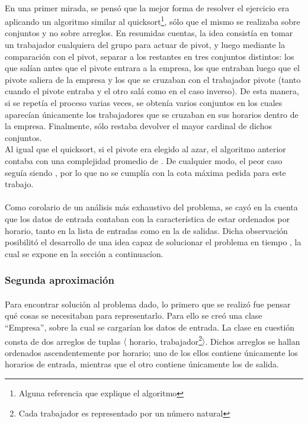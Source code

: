 \paragraph{}
En una primer mirada, se pens\'o que la mejor forma de resolver el ejercicio era aplicando un algoritmo similar al quicksort\footnote{Alguna referencia que explique el algoritmo}, s\'olo que el mismo se realizaba sobre conjuntos y no sobre arreglos. En resumidas cuentas, la idea consist\'ia en tomar un trabajador cualquiera del grupo para actuar de pivot, y luego mediante la comparaci\'on con el pivot, separar a los restantes en tres conjuntos distintos: los que sal\'ian antes que el pivote entrara a la empresa, los que entraban luego que el pivote saliera de la empresa y los que se cruzaban con el trabajador pivote (tanto cuando el pivote entraba y el otro sal\'a como en el caso inverso). De esta manera, si se repet\'ia el proceso varias veces, se obten\'ia varios conjuntos en los cuales aparec\'ian \'unicamente los trabajadores que se cruzaban en sus horarios dentro de la empresa. Finalmente, s\'olo restaba devolver el mayor cardinal de dichos conjuntos.\\
Al igual que el quicksort, si el pivote era elegido al azar, el algoritmo anterior contaba con una complejidad promedio de . De cualquier modo, el peor caso segu\'ia siendo , por lo que no se cumpl\'ia con la cota m\'axima pedida para este trabajo.

\paragraph{}
Como corolario de un an\'alisis m\'as exhaustivo del problema, se cay\'o en la cuenta que los datos de entrada contaban con la caracter\'istica de estar ordenados por horario, tanto en la lista de entradas como en la de salidas. Dicha observación posibilitó el desarrollo de una idea capaz de solucionar el problema en tiempo , la cual se expone en la sección a continuac\'ion.


\subsubsection{Segunda aproximación}
\label{segaprox}
\paragraph{}
Para encontrar soluci\'on al problema dado, lo primero que se realiz\'o fue pensar qu\'e cosas se necesitaban para representarlo. Para ello se cre\'o una clase ``Empresa'', sobre la cual se cargar\'ian los datos de entrada. La clase en cuestión consta de dos arreglos de tuplas $\langle$ horario, trabajador\footnote{Cada trabajador es representado por un número natural}$\rangle$. Dichos arreglos se hallan ordenados ascendentemente por horario; uno de los ellos contiene \'unicamente los horarios de entrada, mientras que el otro contiene \'unicamente los de salida. 

